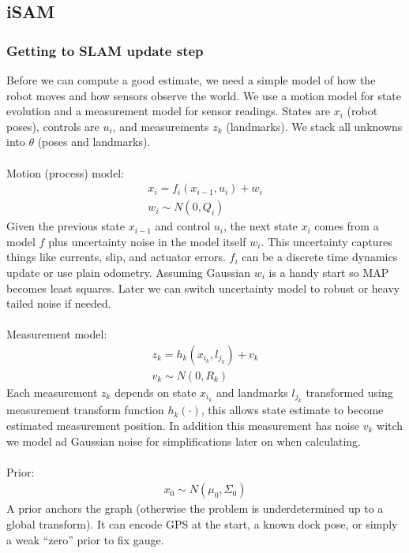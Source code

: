 \subsection{iSAM}
\subsubsection{Getting to SLAM update step}
Before we can compute a good estimate, we need a simple model of how the robot moves and how sensors observe the world. We use a motion model for state evolution and a measurement model for sensor readings. States are $x_i$ (robot poses), controls are $u_i$, and measurements $z_k$ (landmarks). We stack all unknowns into $\theta$ (poses and landmarks).
\\ \\
Motion (process) model:
$$
    \begin{aligned}
        x_i = f_{i}(x_{i-1}, u_i) + w_i \\ 
        w_i \sim N(0, Q_i) \qquad
    \end{aligned}
$$
Given the previous state $x_{i-1}$ and control $u_i$, the next state $x_i$ comes from a model $f$ plus uncertainty noise in the model itself $w_i$. This uncertainty captures things like currents, slip, and actuator errors. $f_i$ can be a discrete time dynamics update or use plain odometry. Assuming Gaussian $w_i$ is a handy start so \gls{MAP} becomes least squares. Later we can switch uncertainty model to robust or heavy tailed noise if needed.
\\ \\
Measurement model:
$$
    \begin{aligned}
        z_k = h_{k}(x_{i_k}, l_{j_k}) + v_k \\ 
        v_k \sim N(0, R_k) \qquad
    \end{aligned}
$$
Each measurement $z_k$ depends on state $x_{i_k}$ and landmarks $l_{j_k}$ transformed using measurement transform function $h_{k}(\cdot)$, this allows state estimate to become estimated measurement position. In addition this measurement has noise $v_k$ witch we model ad Gaussian noise for simplifications later on when calculating.
\\ \\
Prior:
$$
    \begin{aligned}
        x_0 \sim N(\mu_{0}, \Sigma_{0})
    \end{aligned}
$$
A prior anchors the graph (otherwise the problem is underdetermined up to a global transform). It can encode GPS at the start, a known dock pose, or simply a weak ``zero'' prior to fix gauge.
